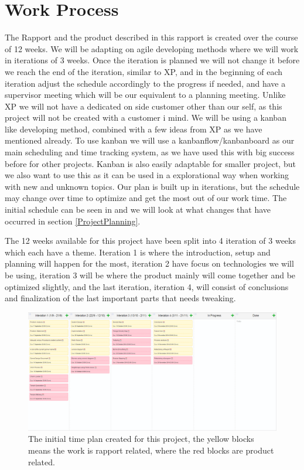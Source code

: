 \section{Work Process}
\label{WorkProcess}
The Rapport and the product described in this rapport is created over the course of 12 weeks. We will be adapting on agile developing methods where we will work in iterations of 3 weeks. Once the iteration is planned we will not change it before we reach the end of the iteration, similar to XP, and in the beginning of each iteration adjust the schedule accordingly to the progress if needed, and have a supervisor meeting which will be our equivalent to a planning meeting. Unlike XP we will not have a dedicated on side customer other than our self, as this project will not be created with a customer i mind. We will be using a kanban like developing method, combined with a few ideas from XP as we have mentioned already. To use kanban we will use a kanbanflow/kanbanboard as our main scheduling and time tracking system, as we have used this with big success before for other projects. Kanban is also easily adaptable for smaller project, but we also want to use this as it can be used in a explorational way when working with new and unknown topics. Our plan is built up in iterations, but the schedule may change over time to optimize and get the most out of our work time. The initial schedule can be seen in  and we will look at what changes that have occurred in section \ref{ProjectPlanning}.

The 12 weeks available for this project have been split into 4 iteration of 3 weeks which each have a theme. Iteration 1 is where the introduction, setup and planning will happen for the most, iteration 2 have focus on technologies we will be using, iteration 3 will be where the product mainly will come together and be optimized slightly, and the last iteration, iteration 4, will consist of conclusions and finalization of the last important parts that needs tweaking.


\begin{figure}[H]
	\includegraphics[width=1\linewidth]{img/InitTimeplan}
	\centering
	\caption{The initial time plan created for this project, the yellow blocks means the work is rapport related, where the red blocks are product related.}
	\label{fig:InitTimeplan}
\end{figure}
